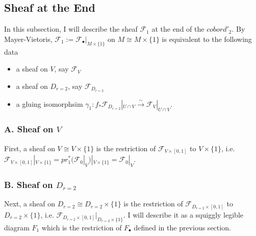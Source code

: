 \subsection*{Sheaf at the End}
In this subsection, I will describe the sheaf $\mathscr{F}_1$ at the end of the $cobord'_2$. By Mayer-Vietoris, $\mathscr{F}_1:= \mathscr{F}_\bullet|_{M\times\{1\}}$ on $M \cong M\times\{1\}$ is equivalent to the following data
\begin{itemize}
\item a sheaf on $V$, say $\mathscr{F}_{V}$

\item a sheaf on $D_{r=2}$, say $\mathscr{F}_{D_{r=2}}$

\item a gluing isomorphsim $\gamma_1 : f_*\mathscr{F}_{D_{r=2}}|_{U\cap V} \xrightarrow{\sim} \mathscr{F}_{V}|_{U\cap V}$.
\end{itemize}

\subsubsection{A. Sheaf on $V$}
First, a sheaf on $V\cong V\times\{1\}$ is the restriction of $\mathscr{F}_{V\times [0,1]}$ to $V\times \{1\}$, i.e. $\mathscr{F}_{V\times [0,1]}|_{V\times \{1\}}= pr_1^*(\mathscr{F}_0|_V)|_{V\times \{1\}} = \mathscr{F}_0|_V$.
\subsubsection{B. Sheaf on $D_{r=2}$}
Next, a sheaf on $D_{r=2}\cong D_{r=2}\times \{1\}$ is the restriction of $\mathscr{F}_{D_{r=2}\times [0,1]}$ to $D_{r=2}\times \{1\}$, i.e. $\mathscr{F}_{D_{r=2}\times [0,1]} |_{D_{r=2}\times \{1\}}$. I will describe it as a squiggly legible diagram $F_1$ which is the restriction of $F_\bullet$ defined in the previous section.

